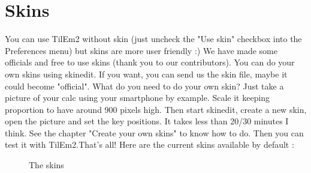 \documentclass[10pt]{report}
\begin{document}
\section{Skins}
You can use TilEm2 without skin (just uncheck the "Use skin" checkbox into the Preferences menu) but skins are more user friendly :)\newline
We have made some officials and free to use skins (thank you to our contributors).\newline
You can do your own skins using skinedit. If you want, you can send us the skin file, maybe it could become "official".\newline\newline
What do you need to do your own skin?\newline
Just take a picture of your calc using your smartphone by example.\newline
Scale it keeping proportion to have around 900 pixels high.\newline
Then start skinedit, create a new skin, open the picture and set the key positions.\newline
It takes less than 20/30 minutes I think.\newline
See the chapter "Create your own skins" to know how to do.\newline
Then you can test it with TilEm2.That's all!\newline
Here are the current skins available by default :\newline
\begin{figure}[H]
\centering
{}
\caption{The skins}
\end{figure}
\end{document}
